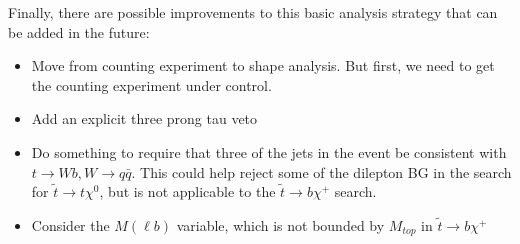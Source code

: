 

Finally, there are possible improvements to this basic analysis strategy that can be added in the future:
\begin{itemize}
\item Move from counting experiment to shape analysis.  But first, we need to get the counting
experiment under control.
\item Add an explicit three prong tau veto
\item Do something to require that three of the jets in the event be consistent with $t \to Wb, W \to q\bar{q}$.
This could help reject some of the dilepton BG in the search for $\widetilde{t} \to t \chi^0$, 
but is not applicable to the $\widetilde{t} \to b \chi^+$ search.
\item Consider the $M(\ell b)$ variable, which is not bounded by $M_{top}$ in $\widetilde{t} \to b \chi^+$
\end{itemize}
